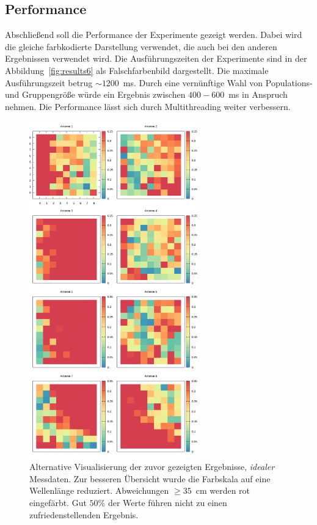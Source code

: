 \subsection{Performance}
%
Abschließend soll die Performance der Experimente gezeigt werden. Dabei wird die gleiche farbkodierte Darstellung verwendet, die auch bei den anderen Ergebnissen verwendet wird. Die Ausführungszeiten der Experimente sind in der Abbildung~\ref{fig:results6} als Falschfarbenbild dargestellt. Die maximale Ausführungszeit betrug $\sim1200$~ms. Durch eine vernünftige Wahl von Populations- und Gruppengröße würde ein Ergebnis zwischen $400-600$~ms in Anspruch nehmen. Die Performance lässt sich durch Multithreading weiter verbessern.
%
\begin{figure}[!ht]
	\centering
	\caption[Limitierte Ergebnisse - Idealer Messwerte]{ Alternative Visualisierung der zuvor gezeigten Ergebnisse, \textit{idealer} Messdaten. Zur besseren Übersicht wurde die Farbskala auf eine Wellenlänge reduziert. Abweichungen $\ge35$~cm werden rot eingefärbt. Gut $50\%$ der Werte führen nicht zu einen zufriedenstellenden Ergebnis. }
	\label{fig:results4}
	\vspace{3mm}
	\includegraphics[width=0.65\textwidth]{img/limitedIdeal.png}
	

\end{figure}
